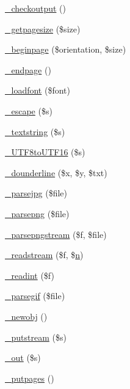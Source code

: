 \begin{DoxyCompactItemize}
\item 
\hyperlink{class_f_p_d_f_a142c29913cacdc9976cccd8d6e336adb}{\+\_\+checkoutput} ()
\item 
\hyperlink{class_f_p_d_f_aa12444ad763641b724c209d6941be147}{\+\_\+getpagesize} (\$size)
\item 
\hyperlink{class_f_p_d_f_a68fb6fa22bb023bdf504b953ff495b72}{\+\_\+beginpage} (\$orientation, \$size)
\item 
\hyperlink{class_f_p_d_f_a852425b910fd9035535904ed622fc06a}{\+\_\+endpage} ()
\item 
\hyperlink{class_f_p_d_f_a2216419f9e18dd21b019089fd57efb80}{\+\_\+loadfont} (\$font)
\item 
\hyperlink{class_f_p_d_f_a927f66568983563cc588c62569fb73d6}{\+\_\+escape} (\$s)
\item 
\hyperlink{class_f_p_d_f_a6f4a715a6fc473c01f76ebb414eb75e5}{\+\_\+textstring} (\$s)
\item 
\hyperlink{class_f_p_d_f_af7fe4a30d0b766ecff3f184b083f47c0}{\+\_\+\+U\+T\+F8to\+U\+T\+F16} (\$s)
\item 
\hyperlink{class_f_p_d_f_a4139800347bfdf7c395bd24443989c2f}{\+\_\+dounderline} (\$x, \$y, \$txt)
\item 
\hyperlink{class_f_p_d_f_a2f1e290b0979e2310b84bab675019964}{\+\_\+parsejpg} (\$file)
\item 
\hyperlink{class_f_p_d_f_ac55d7bc74245176354b9a50d105dd599}{\+\_\+parsepng} (\$file)
\item 
\hyperlink{class_f_p_d_f_a3ecb2fb2e1fc47ada32f3edb442d48e3}{\+\_\+parsepngstream} (\$f, \$file)
\item 
\hyperlink{class_f_p_d_f_acc3b07da9666a1b944ae2a825e9d5c88}{\+\_\+readstream} (\$f, \$\hyperlink{class_8phpmailer_8php_aea57e70878e251b905a43852b76107b0}{n})
\item 
\hyperlink{class_f_p_d_f_a2f553e9f61d7b62dae88552413773b48}{\+\_\+readint} (\$f)
\item 
\hyperlink{class_f_p_d_f_ab61d60e644203796aba87729558fad2f}{\+\_\+parsegif} (\$file)
\item 
\hyperlink{class_f_p_d_f_a6779d67dae49accb4cf7ab5847b11e81}{\+\_\+newobj} ()
\item 
\hyperlink{class_f_p_d_f_a6990e1ae9657cc9e0d408dc42bea62f5}{\+\_\+putstream} (\$s)
\item 
\hyperlink{class_f_p_d_f_a01627a8b7ad5c79ee736572b3d2ef3f5}{\+\_\+out} (\$s)
\item 
\hyperlink{class_f_p_d_f_a759f3c1bfed43a783e073ce9f9b9caff}{\+\_\+putpages} ()
\item 

\end{DoxyCompactItemize}
